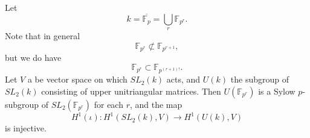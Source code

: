 \begin{example}
	Let
	\begin{displaymath}
		k = \overline{\mathbb{F}_p} = \bigcup_r \mathbb{F}_{p^r}.
	\end{displaymath}
	Note that in general
	\begin{displaymath}
	  \mathbb{F}_{p^r} \not\subset \mathbb{F}_{p^{r+1}},
	\end{displaymath}
	but we do have
	\begin{displaymath}
	  \mathbb{F}_{p^r} \subset \mathbb{F}_{p^{(r + 1)!}}.
	\end{displaymath}
	Let $V$ a be vector space on which $SL_2(k)$ acts, and $U(k)$ the subgroup of $SL_2(k)$ consisting of upper unitriangular matrices. Then $U(\mathbb{F}_{p^r})$ is a Sylow $p$-subgroup of $SL_2(\mathbb{F}_{p^r})$ for each $r$, and the map
	\begin{displaymath}
		H^1(\iota): H^1(SL_2(k), V) \rightarrow H^1(U(k), V)
	\end{displaymath}
	is injective.
\label{eg:sl2ab}
\end{example}
